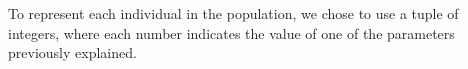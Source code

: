 \documentclass[runningheads]{llncs}
\begin{document}
To represent each individual in the population, we chose to use a tuple of integers, where each number indicates the value of one of the parameters previously explained.




 
 


\end{document}
